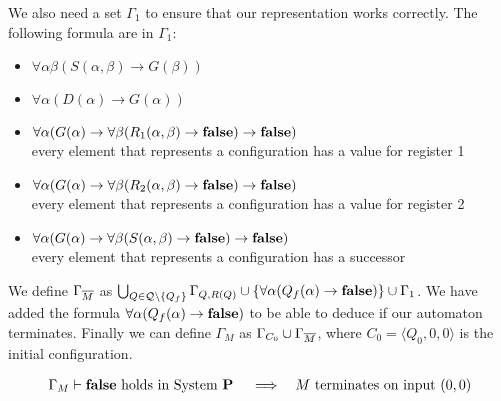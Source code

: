 We also need a set $\Gamma_1$ to ensure that our representation works correctly. The following formula are in $\Gamma_1$:
\begin{itemize}
	\item $\forall\alpha\beta(S(\alpha,\beta)\to G(\beta))$
	\item $\forall\alpha(D(\alpha)\to G(\alpha))$	
	\item $\forall\alpha(G(\alpha)\to\forall\beta(R_1(\alpha,\beta)\to\textbf{false})\to\textbf{false})$\\every element that represents a configuration has a value for register 1
	\item $\forall\alpha(G(\alpha)\to\forall\beta(R_2(\alpha,\beta)\to\textbf{false})\to\textbf{false})$\\every element that represents a configuration has a value for register 2
	\item $\forall\alpha(G(\alpha)\to\forall\beta(S(\alpha,\beta)\to\textbf{false})\to\textbf{false})$\\every element that represents a configuration has a successor
\end{itemize}
We define $\Gamma_{\overline{M}}$ as $\bigcup_{Q\in\mathcal{Q}\setminus\{Q_f\}}\Gamma_{Q,R(Q)}\cup\{\forall\alpha(Q_f(\alpha)\to\textbf{false})\}\cup\Gamma_1$. We have added the formula $\forall\alpha(Q_f(\alpha)\to\textbf{false})$ to be able to deduce \false{} if our automaton terminates.
Finally we can define $\Gamma_M$ as $\Gamma_{C_0}\cup\Gamma_{\overline{M}}$, where $C_0=\langle Q_0,0,0\rangle$ is the initial configuration.
\begin{lemma}\label{cla.3.5}
	\begin{align*}
		  & \text{$\Gamma_M\vdash\textbf{false}$ holds in System \textbf{P}} &   & \implies & \text{$M$ terminates on input $(0,0)$} 
	\end{align*}
\end{lemma}
